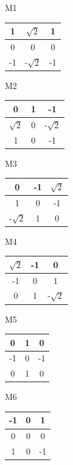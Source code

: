 \documentclass[
	12pt,				%
	oneside,			%
	a4paper,			%
	english,			%
	french,				%
	spanish,			%
	brazil,				%
	]{abntex2}
\begin{document}
\begin{center}
M1
\begin{tabular}{|c|c|c|}
    \hline
     	 	 	 1 &  \(\sqrt{2}\) &  1            \\ \hline
	             0 &             0 &  0             \\ \hline   
	            -1 & -\(\sqrt{2}\) & -1             \\ \hline   
\end{tabular}
M2
\begin{tabular}{|c|c|c|}
    \hline
     	 	 	 0 &             1 & -1             \\ \hline
	  \(\sqrt{2}\) &             0 & -\(\sqrt{2}\)  \\ \hline   
	             1 &             0 & -1             \\ \hline   
\end{tabular}
M3
\begin{tabular}{|c|c|c|}
    \hline
     	 	 	 0 &            -1 & \(\sqrt{2}\)   \\ \hline
	             1 &             0 & -1             \\ \hline   
	 -\(\sqrt{2}\) &             1 &  0             \\ \hline   
\end{tabular}
\end{center}

\begin{center}
M4
\begin{tabular}{|c|c|c|}
    \hline
      \(\sqrt{2}\) &            -1 &  0             \\ \hline
	            -1 &             0 & 1              \\ \hline   
	             0 &             1 & -\(\sqrt{2}\)  \\ \hline   
\end{tabular}
M5
\begin{tabular}{|c|c|c|}
    \hline
     	 	 	 0 &             1 &  0              \\ \hline
	            -1 &             0 & -1             \\ \hline   
	             0 &             1 &  0             \\ \hline   
\end{tabular}
M6
\begin{tabular}{|c|c|c|}
    \hline
     	 	 	-1 &             0 &  1            \\ \hline
	             0 &             0 &  0             \\ \hline   
	             1 &             0 & -1             \\ \hline   
\end{tabular}
\end{center}
\end{document}
